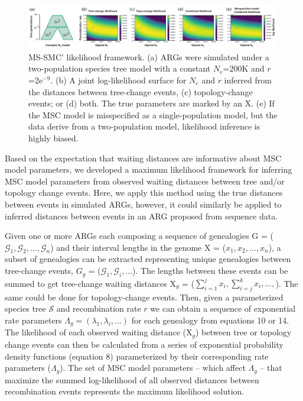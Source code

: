 \documentclass[11pt]{article}
\begin{document}
\begin{figure}[t]
	\centering
	\includegraphics[width=0.99\textwidth]{figures/likelihood-figure3.pdf}
	\caption{
		MS-SMC' likelihood framework. (a) ARGs were simulated under a
		two-population species tree model with a constant $N_e$=200K and 
		$r$=2e$^{-9}$. (b) A joint log-likelihood surface for $N_e$ and 
		$r$ inferred from the distances between tree-change events, 
		(c) topology-change events; or (d) both. The true parameters are
		marked by an X. (e) If the MSC model is
		misspecified as a single-population model, but the data derive from 
		a two-population model, likelihood inference	is highly biased.
	}
	\label{fig:fig-likelihood}
\end{figure}

Based on the expectation that waiting distances are informative about 
MSC model parameters, we developed a maximum likelihood framework for inferring 
MSC model parameters from observed waiting distances between tree and/or topology 
change events. Here, we apply this method using the true distances between 
events in simulated ARGs, however, it could similarly be applied to inferred 
distances between events in an ARG proposed from sequence data. 

Given one or more ARGs each composing a sequence of genealogies 
G = ($\mathcal{G}_1, \mathcal{G}_2, ..., \mathcal{G}_n$) and 
their interval lengths in the genome X = ($x_1, x_2, ..., x_n$), a subset 
of genealogies can be extracted representing unique genealogies between 
tree-change events, $G_g$ = ($\mathcal{G}_1, \mathcal{G}_i, ...$). The lengths 
between these events can be summed to get tree-change waiting distances
X$_g$ = ($\sum_{i=1}^j x_i, \sum_{i=j}^{k} x_i, ..., $). The same could be 
done for topology-change events. Then, given a parameterized species 
tree $\mathcal{S}$ and recombination rate $r$ we can obtain a sequence of 
exponential rate parameters $\Lambda_g = (\lambda_1, \lambda_i, ...)$ for
each genealogy from equations 10 or 14. 
The likelihood of each observed waiting distance (X$_g$) between tree or
topology change events can then be calculated from a series of exponential 
probability density functions (equation 8) parameterized by their 
corresponding rate parameters ($\Lambda_g$). 
The set of MSC model parameters -- which affect $\Lambda_g$ -- 
that maximize the summed log-likelihood of all observed distances 
between recombination events represents the maximum likelihood solution.
\end{document}
